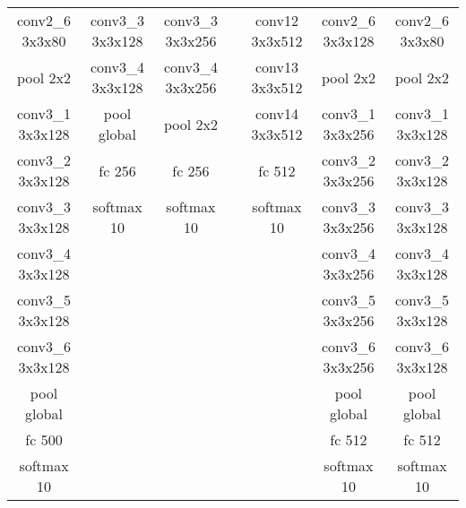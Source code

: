 \begin{table}[h]
{\begin{tabular}{|c|c|c|c|c|c|c|}
    conv2\_6 3x3x80  & conv3\_3 3x3x128  & conv3\_3 3x3x256   &                   & conv12 3x3x512   & conv2\_6 3x3x128  & conv2\_6 3x3x80    \\
    pool 2x2         & conv3\_4 3x3x128  & conv3\_4 3x3x256   &                   & conv13 3x3x512   & pool 2x2          & pool 2x2           \\ \cline{1-1} \cline{6-7} 
    conv3\_1 3x3x128 & pool global       & pool 2x2           &                   & conv14 3x3x512   & conv3\_1 3x3x256  & conv3\_1 3x3x128   \\ \cline{2-3} \cline{5-5}
    conv3\_2 3x3x128 & fc 256            & fc 256             &                   & fc 512           & conv3\_2 3x3x256  & conv3\_2 3x3x128   \\
    conv3\_3 3x3x128 & softmax 10        & softmax 10         &                   & softmax 10       & conv3\_3 3x3x256  & conv3\_3 3x3x128   \\
    conv3\_4 3x3x128 &                   &                    &                   &                  & conv3\_4 3x3x256  & conv3\_4 3x3x128   \\
    conv3\_5 3x3x128 &                   &                    &                   &                  & conv3\_5 3x3x256  & conv3\_5 3x3x128   \\
    conv3\_6 3x3x128 &                   &                    &                   &                  & conv3\_6 3x3x256  & conv3\_6 3x3x128   \\
    pool global      &                   &                    &                   &                  & pool global       & pool global        \\ \cline{1-1} \cline{6-7} 
    fc 500           &                   &                    &                   &                  & fc 512            & fc 512             \\
    softmax 10       &                   &                    &                   &                  & softmax 10        & softmax 10         \\ \hline
    \end{tabular}
}
\label{models-table}
\end{table}